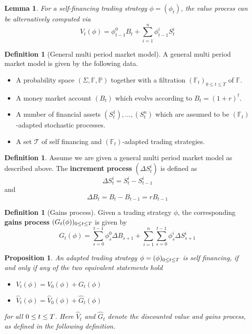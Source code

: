\documentclass[10pt, oneside, reqno]{amsart}
\theoremstyle{plain}%
\newtheorem{lem}[thm]{Lemma}
\newtheorem{prop}[thm]{Proposition}
\theoremstyle{definition}
\newtheorem{defn}[thm]{Definition}
\theoremstyle{remark}
\newcommand{\F}{\mathbb{F}}
\newcommand{\sumni}{\sum_{i=1}^n}
\begin{document}
\begin{lem}
    For a self-financing trading strategy $\phi = (\phi_t)$, the value process can be alternatively computed via \[
        V_t(\phi) = \phi_{t-1}^0 B_t + \sumni \phi^i_{t-1} S^i_t
    \]
\end{lem}


\begin{defn}[General multi period market model]
        A general multi period market model is given by the following data.
        \begin{itemize}
            \item A probability space $(\Sigma, \F, \mathbb{P})$ together with a filtration $(\F_t)_{0 \leq t \leq T}$ of $\F$.
            \item A money market account $(B_t)$ which evolvs according to $B_t = (1 +r)^t$.
            \item A number of financial assets $(S^1_t), \dots, (S^n_t)$ which are assumed to be $(\F_t)$-adapted stochastic processes.  
            \item A set $\mathcal{T}$ of self financing and $(\F_t)$-adapted trading strategies. 
        \end{itemize}
\end{defn}


\begin{defn}
        Assume we are given a general multi period market model as described above.  The \textbf{increment process} $(\Delta S^i_{t})$ is defined as \[
            \Delta S_t^i = S^i_t - S^i_{t-1}
        \]
        and \[
            \Delta B_t = B_t - B_{t-1} =  r B_{t-1} 
        \]
\end{defn}

\begin{defn}[Gains process]
    Given a trading strategy $\phi$, the corresponding \textbf{gains process} $(G_t(\phi))_{0 \leq t \leq T}$ is given by \[
        G_t(\phi) = \sum_{s=0}^{t-1} \phi_s^0 \Delta B_{s+1} + \sumni \sum_{s=0}^{t-1} \phi_s^i \Delta S^i_{s+1}
    \]
\end{defn} 

\begin{prop}
    An adapted trading strategy $\phi = (\phi)_{0 \leq t \leq T}$ is self financing, if and only if any of the two equivalent statements hold 
    \begin{itemize}
        \item $V_t(\phi) = V_0(\phi) + G_t(\phi)$
        \item $\hat{V}_t(\phi) = \hat{V}_0(\phi) + \hat{G}_t(\phi)$
    \end{itemize}
    for all $0 \leq t \leq T$.  Here $\hat{V}_t$ and $\hat{G}_t$ denote the discounted value and gains process, as defined in the following definition.
\end{prop}
\end{document}
